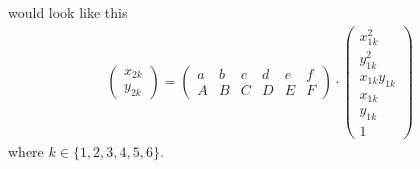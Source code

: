 \documentclass[12pt]{article}
\begin{document}
    would look like this 
    \begin{align}
        \label{spec}
        \begin{pmatrix}
            x_{2k} \\
            y_{2k}
        \end{pmatrix}
        =
        \begin{pmatrix}
            a & b & c & d & e & f \\
            A & B & C & D & E & F
        \end{pmatrix}
        \cdot
        \begin{pmatrix}
            x_{1k}^{2} \\
            y_{1k}^{2} \\
            x_{1k}y_{1k} \\
            x_{1k} \\
            y_{1k} \\
            1
        \end{pmatrix}        
    \end{align}
    where $k \in \{1,2,3,4,5,6\}$. 
\end{document}
